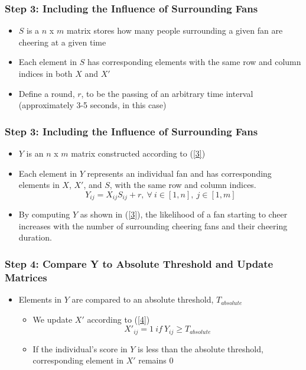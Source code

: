 \documentclass[compress,handout,10pt]{beamer}
\let\olditem\item
\renewcommand{\item}{\setlength{\itemsep}{0.5\baselineskip}\olditem}
\begin{document}
\begin{frame}
\frametitle{Step 3: Including the Influence of Surrounding Fans}
\begin{itemize}
\item $S$ is a $n$ x $m$ matrix stores how many people surrounding a given fan are cheering at a given time
\item Each element in $S$ has corresponding elements with the same row and column indices in both $X$ and $X'$
\item Define a round, $r$, to be the passing of an arbitrary time interval (approximately 3-5 seconds, in this case) 
\end{itemize}
\end{frame}

\begin{frame}
	\frametitle{Step 3: Including the Influence of Surrounding Fans}
		\begin{itemize}
		\item $Y$ is an $n$ x $m$ matrix constructed according to (\ref{3})
		\item Each element in $Y$ represents an individual fan and has corresponding elements in $X$, $X'$, and $S$, with the same row and column indices.	
		\begin{equation}
				Y_{ij}=X_{ij}S_{ij}+r,~\forall~i\in[1,n],~j\in[1,m]
		\label{3}
		\end{equation}
		\item By computing $Y$ as shown in (\ref{3}), the likelihood of a fan starting to cheer increases with the number of surrounding cheering fans and their cheering duration.
		\end {itemize}
\end{frame}	 

\begin{frame}
\frametitle{Step 4: Compare Y to Absolute Threshold and Update Matrices}
\begin{itemize} 
\item Elements in $Y$  are compared to an absolute threshold, $T_{absolute}$ \newline
	\begin{itemize} 
		\item We update $X'$ according to (\ref{4})
		\begin{equation}
			X'_{ij}=1~if~Y_{ij}\geq T_{absolute}
			\label{4}
		\end{equation}
		\item If the individual's score in $Y$ is less than the absolute threshold, corresponding element in $X'$ remains 0  
\end{itemize}
\end{itemize}
\end{frame}
\end{document}

